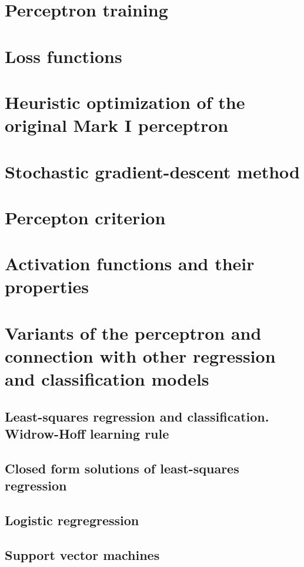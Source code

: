 \section{Perceptron training}


\section{Loss functions}

\section{Heuristic optimization of the original Mark I perceptron}

\section{Stochastic gradient-descent method}

\section{Percepton criterion}

\section{Activation functions and their properties}

\section{Variants of the perceptron and 
    connection with other regression and classification models}

\subsection{Least-squares regression and classification. Widrow-Hoff learning rule}

\subsection{Closed form solutions of least-squares regression}

\subsection{Logistic regregression}

\subsection{Support vector machines}

